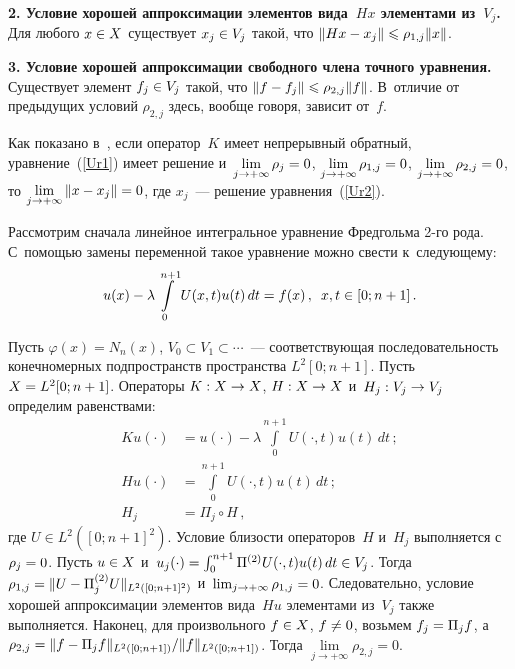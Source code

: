 \begin{multicols}{2}
\noindent \textbf{2. Условие хорошей аппроксимации элементов 
вида~$Hx$ элементами из~$V_j$.} Для любого $x\hm\in X$ существует $x_j\hm\in V_j$ 
такой, что $\|Hx-x_j\|\hm\leqslant \rho_{1,j} \|x\|$.

\noindent \textbf{3. Условие хорошей аппроксимации свободного члена 
точного уравнения.} Существует элемент $f_j \hm\in V_j$ такой, что $\|f-f_j\|
\hm\leqslant \rho_{2,j}\|f\|$. В~отличие от предыду\-щих условий $\rho_{2,j}$ 
здесь, вообще говоря, зависит от~$f$.

Как показано в~\cite{Akilov}, если оператор~$K$ 
имеет непрерывный обратный, уравнение~(\ref{Ur1}) имеет решение 
и~$\lim\limits_{j\to +\infty} \rho_j \hm= 0$,  $\lim\limits_{j\to +\infty} \rho_{1,j} \hm= 
0$,  $\lim\limits_{j\to +\infty} \rho_{2,j} \hm= 0$, то  
$\lim\limits_{j\to +\infty} \|x-x_j\|\hm = 0$, где $x_j$~--- 
решение уравнения~(\ref{Ur2}).

Рассмотрим сначала линейное интегральное уравнение Фредгольма 2-го рода. 
С~помощью замены переменной такое уравнение можно свести к~следующему:
\begin{equation*}
u(x)-\lambda\int\limits_{0}^{n+1}U(x,t)u(t)\,dt =f(x)\,,\enskip x,t\in [0;n+1]\,.
\end{equation*}

Пусть $\varphi(x)=N_n(x)$, $V_{0} \subset V_{1} \subset\cdots$~--- 
соответствующая последовательность конечномерных подпространств пространства
 ${L}^{2} \left[0;n+1\right]$. Пусть $X\hm={L}^2[0;n+1]$. 
 Операторы $K:X\hm\to X$, $H:X\hm\to X$ и~$H_j : V_j\hm\to V_j$ определим равенствами:
\begin{align*}
Ku(\cdot)&=u(\cdot)-\lambda\int\limits_0^{n+1} U(\cdot,t)u(t)\,dt\,;\\
Hu(\cdot)&=\int\limits_0^{n+1} U(\cdot,t)u(t)\,dt\,;\\
H_j&=\Pi_j\circ H\,,
\end{align*}
где $U\in {L}^2([0;n+1]^2)$. Условие близости операторов~$H$ и~$H_j$ 
выполняется с~$\rho_j\hm=0$. Пусть  $u\hm\in X$ и~$u_j(\cdot)\hm=\int\nolimits_0^{n+1} 
\Pi^{(2)}U(\cdot,t)u(t)\,dt\hm\in V_j$. То\-гда $\rho_{1,j}\hm=
\|U-\Pi_j^{(2)}U\|_{{L}^2([0;n+1]^2)}$ 
и~$\lim\nolimits_{j\to +\infty} \rho_{1,j}\hm=0$. Следовательно, 
условие хорошей аппроксимации элементов вида~$Hu$ элементами из~$V_j$ 
также выполняется. Наконец, для произвольного $f\hm\in X$, $f\hm\ne 0$, 
возьмем $f_j\hm=\Pi_j f$, 
а~$\rho_{2,j}\hm={\|f-\Pi_j f\|_{{L}^2([0;n+1])}}/{\|f\|_{{L}^2([0;n+1])}}$. Тогда $\lim\limits_{j\to +\infty} \rho_{2,j}=0$. 


\end{multicols}
